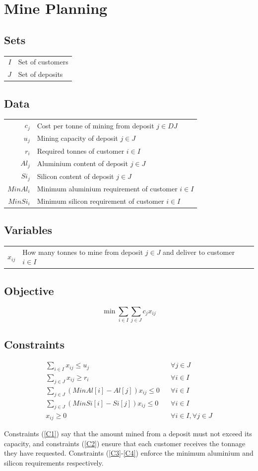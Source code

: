 \documentclass{article}
\begin{document}
	\section*{Mine Planning}
	\subsection*{Sets}
	
	\begin{tabular}{rl}
		$I$ & Set of customers\\
		$J$ & Set of deposits
	\end{tabular}

	\subsection*{Data}
	
	\begin{tabular}{rl}
		$c_j$ & Cost per tonne of mining from deposit $j\in DJ$\\
		$u_j$ & Mining capacity of deposit $j\in J$\\
		$r_i$ & Required tonnes of customer $i\in I$\\
		$Al_j$ & Aluminium content of deposit $j\in J$\\
		$Si_j$ & Silicon content of deposit $j\in J$\\
		$MinAl_i$ & Minimum aluminium requirement of customer $i\in I$\\
		$MinSi_i$ & Minimum silicon requirement of customer $i\in I$		
	\end{tabular}

	\subsection*{Variables}
	
	\begin{tabular}{rl}
		$x_{ij}$ & How many tonnes to mine from deposit $j\in J$ and deliver to customer $i\in I$
	\end{tabular}

	\subsection*{Objective}
	\begin{equation*}
	\min \sum_{i\in I}\sum_{j\in J}c_j x_{ij} 
	\end{equation*}
	
	\subsection*{Constraints}
	\begin{align}
		\sum_{i\in I} x_{ij} \leq u_j && \forall j\in J\label{C1}\\
		\sum_{j\in J} x_{ij} \geq r_i && \forall i\in I\label{C2}\\
		\sum_{j\in J}\left(MinAl[i]-Al[j]\right)x_{ij} \leq 0 && \forall i\in I\label{C3}\\
		\sum_{j\in J}\left(MinSi[i]-Si[j]\right)x_{ij} \leq 0 && \forall i\in I\label{C4}\\
		x_{ij}\geq 0 && \forall i\in I, \forall j\in J\label{C5}
	\end{align}
	
	Constraints (\ref{C1}) say that the amount mined from a deposit must not exceed its capacity, and constraints (\ref{C2}) ensure that each customer receives the tonnage they have requested. Constraints (\ref{C3}-\ref{C4}) enforce the minimum aluminium and silicon requirements respectively.
\end{document}
